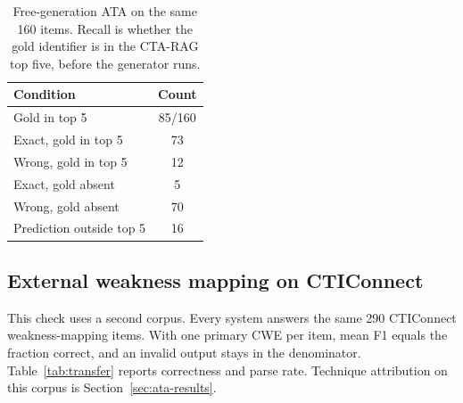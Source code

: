 \documentclass[5p,times,authoryear]{elsarticle}
\begin{document}
\begin{table}[t]
\centering
\small
\caption{Free-generation ATA on the same 160 items. Recall is whether the gold identifier is in the CTA-RAG top five, before the generator runs.}
\label{tab:ata-split}
\begin{tabular}{@{}lc@{}}
\toprule
Condition & Count \\
\midrule
Gold in top 5 & 85/160 \\
Exact, gold in top 5 & 73 \\
Wrong, gold in top 5 & 12 \\
Exact, gold absent & 5 \\
Wrong, gold absent & 70 \\
Prediction outside top 5 & 16 \\
\bottomrule
\end{tabular}
\end{table}

\subsection{External weakness mapping on CTIConnect}\label{sec:transfer}

This check uses a second corpus. Every system answers the same 290 CTIConnect weakness-mapping items. With one primary CWE per item, mean F1 equals the fraction correct, and an invalid output stays in the denominator. Table~\ref{tab:transfer} reports correctness and parse rate. Technique attribution on this corpus is Section~\ref{sec:ata-results}.
\end{document}
